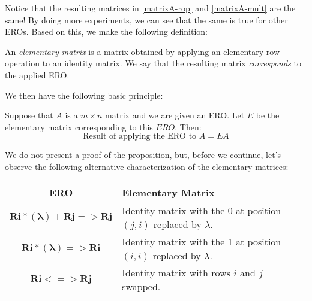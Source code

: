 \documentclass[12pt]{article}
\begin{document}
Notice that the resulting matrices in \ref{matrixA-rop} and \ref{matrixA-mult} are the same! By doing more experiments, we can see that the same is true for other EROs. Based on this, we make the following definition:

\begin{definition} An \emph{elementary matrix} is a matrix obtained by applying an elementary row operation to an identity matrix. We say that the resulting matrix \emph{corresponds} to the applied ERO.
\end{definition}

We then have the following basic principle:
\begin{proposition} Suppose that $A$ is a $m\times n$ matrix and we are given an ERO. Let $E$ be the elementary matrix corresponding to this $ERO$. Then:
\[
\text{Result of applying the ERO to $A$}=EA
\]
\end{proposition}
We do not present a proof of the proposition, but, before we continue, let's observe the following alternative characterization of the elementary matrices:

\begin{center}
\begin{tabular}{|c|p{4.5in}|}\hline
\textbf{ERO} & \textbf{Elementary Matrix}\\\hline
$\mathbf{Ri*(\lambda)+Rj=>Rj}$ & Identity matrix with the 0 at position $(j,i)$ replaced by $\lambda$.\\\hline
$\mathbf{Ri*(\lambda)=>Ri}$ & Identity matrix with the 1 at position $(i,i)$ replaced by $\lambda$.\\\hline
$\mathbf{Ri<=>Rj}$ & Identity matrix with rows $i$ and $j$ swapped.\\\hline
\end{tabular}
\end{center}
\end{document}
